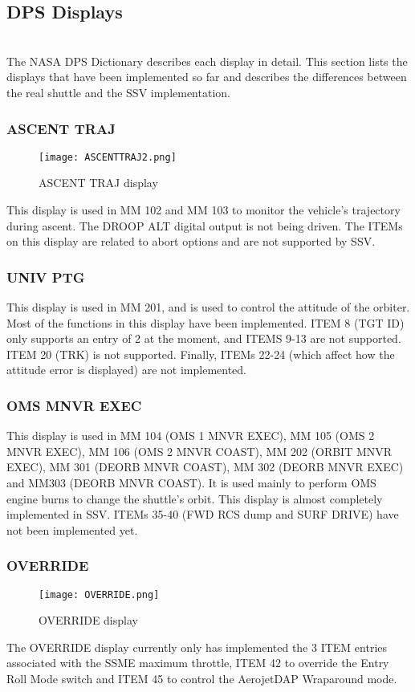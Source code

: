 \documentclass[Space_Shuttle_Vessel_Manual.tex]{subfiles}
\begin{document}
\subsection{DPS Displays}
\begin{multicols*}{2}
\label{sec:dps-displays}
\noindent
\\
The NASA DPS Dictionary describes each display in detail. This section lists the displays that have been implemented so far and describes the differences between the real shuttle and the SSV implementation.


\subsubsection{ASCENT TRAJ}
\begin{figure}[H]
  \texttt{[image: ASCENTTRAJ2.png]}
  \caption{ASCENT TRAJ display}
  \label{fig:ASCENT_TRAJ}
\end{figure}
This display is used in MM 102 and MM 103 to monitor the vehicle's trajectory during ascent. The DROOP ALT digital output is not being driven. The ITEMs on this display are related to abort options and are not supported by SSV.

\subsubsection{UNIV PTG}
This display is used in MM 201, and is used to control the attitude of the orbiter. Most of the functions in this display have been implemented. ITEM 8 (TGT ID) only supports an entry of 2 at the moment, and ITEMS 9-13 are not supported. ITEM 20 (TRK) is not supported. Finally, ITEMs 22-24 (which affect how the attitude error is displayed) are not implemented.

\subsubsection{OMS MNVR EXEC}
This display is used in MM 104 (OMS 1 MNVR EXEC), MM 105 (OMS 2 MNVR EXEC), MM 106 (OMS 2 MNVR COAST), MM 202 (ORBIT MNVR EXEC), MM 301 (DEORB MNVR COAST), MM 302 (DEORB MNVR EXEC) and MM303 (DEORB MNVR COAST). It is used mainly to perform OMS engine burns to change the shuttle's orbit.
This display is almost completely implemented in SSV. ITEMs 35-40 (FWD RCS dump and SURF DRIVE) have not been implemented yet.

\subsubsection{OVERRIDE}
\begin{figure}[H]
  \texttt{[image: OVERRIDE.png]}
  \caption{OVERRIDE display}
  \label{fig:OVERRIDE}
\end{figure}
The OVERRIDE display currently only has implemented the 3 ITEM entries associated with the SSME maximum throttle, ITEM 42 to override the Entry Roll Mode switch and ITEM 45 to control the AerojetDAP Wraparound mode.


\end{multicols*}
\end{document}
